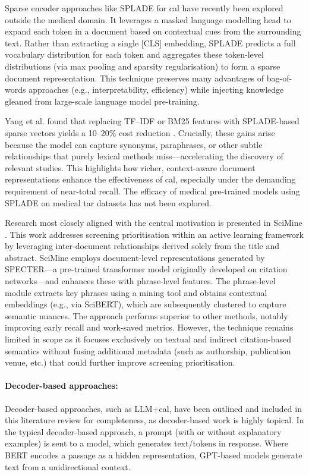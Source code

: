\documentclass[10pt,oneside]{book}
\begin{document}
Sparse encoder approaches like SPLADE for \gls*{cal} have recently been explored outside the medical domain. It leverages a masked language modelling head to expand each token in a document based on contextual cues from the surrounding text. Rather than extracting a single [CLS] embedding, SPLADE predicts a full vocabulary distribution for each token and aggregates these token-level distributions (via max pooling and sparsity regularisation) to form a sparse document representation. This technique preserves many advantages of bag-of-words approaches (e.g., interpretability, efficiency) while injecting knowledge gleaned from large-scale language model pre-training.

Yang et al. found that replacing TF–IDF or BM25 features with SPLADE-based sparse vectors yields a 10–20\% cost reduction \cite{yang_contextualization_2024}. Crucially, these gains arise because the model can capture synonyms, paraphrases, or other subtle relationships that purely lexical methods miss—accelerating the discovery of relevant studies. This highlights how richer, context-aware document representations enhance the effectiveness of \gls*{cal}, especially under the demanding requirement of near-total recall. The efficacy of medical pre-trained models using SPLADE on medical \gls*{tar} datasets has not been explored.

Research most closely aligned with the central motivation is presented in SciMine \cite{guo_scimine_2023}. This work addresses screening prioritisation within an active learning framework by leveraging inter-document relationships derived solely from the title and abstract. SciMine employs document-level representations generated by SPECTER—a pre-trained transformer model originally developed on citation networks—and enhances these with phrase-level features. The phrase-level module extracts key phrases using a mining tool and obtains contextual embeddings (e.g., via SciBERT), which are subsequently clustered to capture semantic nuances. The approach performs superior to other methods, notably improving early recall and work-saved metrics. However, the technique remains limited in scope as it focuses exclusively on textual and indirect citation-based semantics without fusing additional metadata (such as authorship, publication venue, etc.) that could further improve screening prioritisation.


\paragraph{Decoder-based approaches: }
Decoder-based approaches, such as LLM+\gls*{cal}, have been outlined and included in this literature review for completeness, as decoder-based work is highly topical. In the typical decoder-based approach, a prompt (with or without explanatory examples) is sent to a model, which generates text/tokens in response. Where BERT encodes a passage as a hidden representation, GPT-based models generate text from a unidirectional context.
\end{document}
